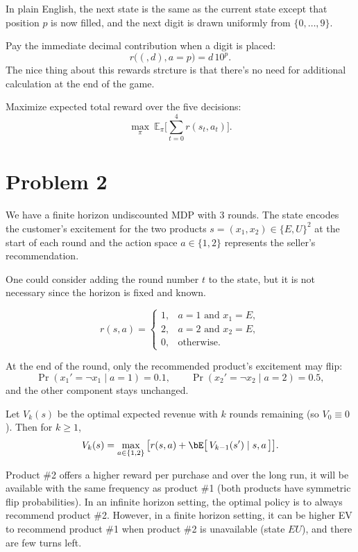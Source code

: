 \documentclass[12pt]{article}
\begin{document}
In plain English, the next state is the same as the current state except that position $p$ is now filled,
and the next digit is drawn uniformly from $\{0,\ldots,9\}$.

\medskip
\noindent{} Pay the immediate decimal contribution when a digit is placed:
\[
		r\big((\bm,d),a=p\big)= d\,10^{p}.
\]
The nice thing about this rewards strcture is that there's no need for additional calculation at
the end of the game.

\medskip
\noindent{} Maximize expected total reward over the five decisions:
\[
		\max_{\pi}\ \mathbb{E}_{\pi}\Big[\sum_{t=0}^{4} r(s_t,a_t)\Big].
\]

\newpage
\section*{Problem 2}


We have a finite horizon undiscounted MDP with 3 rounds. The state encodes the customer's excitement
for the two products $s=(x_1,x_2)\in\{E,U\}^2$ at the start of each round and the action space
$a\in\{1,2\}$ represents the seller's recommendation.

One could consider adding the round number $t$ to the state, but it is not necessary since the horizon is fixed and known.

\medskip
\noindent{}
\[
		r(s,a)=
		\begin{cases}
				1, & a=1 \text{ and } x_1=E,\\
				2, & a=2 \text{ and } x_2=E,\\
				0, & \text{otherwise.}
		\end{cases}
\]

\medskip
\noindent{}
At the end of the round, only the recommended product’s excitement may flip:
\[
		\Pr(x_1'=\neg x_1\mid a=1)=0.1,\qquad \Pr(x_2'=\neg x_2\mid a=2)=0.5,
\]
and the other component stays unchanged.

\medskip
\noindent{}
Let $V_k(s)$ be the optimal expected revenue with $k$ rounds remaining (so $V_0\equiv 0$). Then for $k\ge 1$,
\[
		V_k(s)=\max_{a\in\{1,2\}}\big[r(s,a)+\bE\big[\,V_{k-1}(s')\mid s,a\,\big]\big].
\]

\noindent{} Product \#2 offers a higher reward per purchase and over the long run,
it will be available with the same frequency as product \#1 (both products have symmetric flip probabilities).
In an infinite horizon setting, the optimal policy is to always recommend product \#2.
However, in a finite horizon setting, it can be higher EV to recommend product \#1 when product \#2 is
unavailable (state $EU$), and there are few turns left.
\end{document}
